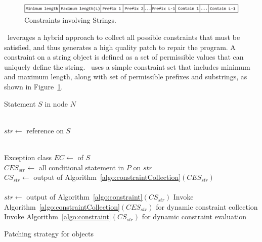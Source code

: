 %
\begin{figure}[t]
\centering
\includegraphics[width=\linewidth]{images/constraint.eps}
\caption{Constraints involving Strings.}
\label{fig:constraint}
\end{figure}
% 

 \tool\ leverages a hybrid
approach to collect all possible constraints that must be satisfied, and thus
generates a high quality patch to repair the program. A constraint on a string
object is defined as a set of permissible values that can uniquely define the
string. \tool\ uses a simple constraint set that includes minimum and maximum
length, along with set of permissible prefixes and substrings, as shown in
Figure~\ref{fig:constraint}.

\begin{algorithm}[t]
\scriptsize
\DontPrintSemicolon
{}
\Begin
{
  {
  Statement $S$ in node $N$\\
   {\\
  	\mytab $str \longleftarrow$  reference on $S$
  	
  	 {\\
  	  \mytab Exception class $EC \longleftarrow$  of
$S$\\
          \mytab $CES_{str} \longleftarrow$ all conditional statement in $P$ on
$str$\\
  	  \mytab $CS_{str} \longleftarrow$ output of
Algorithm~\ref{algo:constraintCollection}$(CES_{str})$\\

  		\mytab {} {\\
  			\mytab \mytab $str \longleftarrow$ output of
Algorithm~\ref{algo:constraint}$(CS_{str})$
  		} \mytab {}
  		\mytab Invoke
Algorithm~\ref{algo:constraintCollection}$(CES_{str})$ for dynamic constraint
collection\\
  		\mytab Invoke Algorithm~\ref{algo:constraint}$(CS_{str})$ for
dynamic constraint evaluation
  	}
  }
 }
}
\caption{Patching strategy for  objects}
\label{algo:patchingStrategy}
\end{algorithm}


